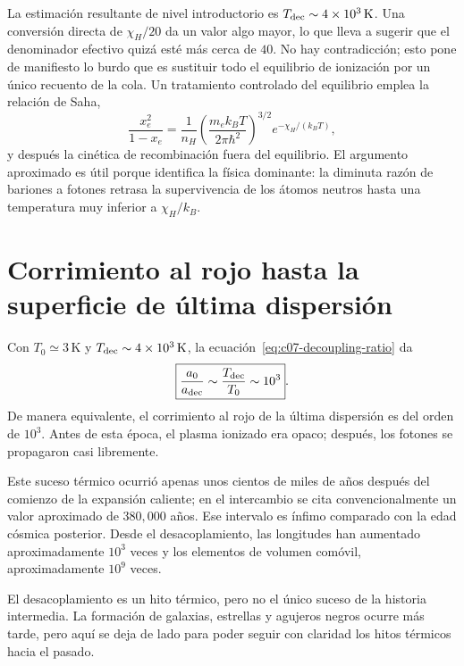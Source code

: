 La estimación resultante de nivel introductorio es \(T_{\rm dec}\sim4\times10^3\,\mathrm{K}\). Una conversión directa de \(\chi_H/20\) da un valor algo mayor, lo que lleva a sugerir que el denominador efectivo quizá esté más cerca de \(40\). No hay contradicción; esto pone de manifiesto lo burdo que es sustituir todo el equilibrio de ionización por un único recuento de la cola. Un tratamiento controlado del equilibrio emplea la relación de Saha,
\begin{equation}
\frac{x_e^2}{1-x_e}
=
\frac{1}{n_H}
\left(\frac{m_e k_BT}{2\pi\hbar^2}\right)^{3/2}
e^{-\chi_H/(k_BT)},
\label{eq:c07-saha}
\end{equation}
y después la cinética de recombinación fuera del equilibrio. El argumento aproximado es útil porque identifica la física dominante: la diminuta razón de bariones a fotones retrasa la supervivencia de los átomos neutros hasta una temperatura muy inferior a \(\chi_H/k_B\).

\section{Corrimiento al rojo hasta la superficie de última dispersión}

Con \(T_0\simeq3\,\mathrm{K}\) y \(T_{\rm dec}\sim4\times10^3\,\mathrm{K}\), la ecuación~\eqref{eq:c07-decoupling-ratio} da
\begin{equation}
\boxed{
\frac{a_0}{a_{\rm dec}}
\sim
\frac{T_{\rm dec}}{T_0}
\sim10^3
}.
\label{eq:c07-decoupling-expansion}
\end{equation}
De manera equivalente, el corrimiento al rojo de la última dispersión es del orden de \(10^3\). Antes de esta época, el plasma ionizado era opaco; después, los fotones se propagaron casi libremente.

Este suceso térmico ocurrió apenas unos cientos de miles de años después del comienzo de la expansión caliente; en el intercambio se cita convencionalmente un valor aproximado de \(380{,}000\) años. Ese intervalo es ínfimo comparado con la edad cósmica posterior. Desde el desacoplamiento, las longitudes han aumentado aproximadamente \(10^3\) veces y los elementos de volumen comóvil, aproximadamente \(10^9\) veces.

El desacoplamiento es un hito térmico, pero no el único suceso de la historia intermedia. La formación de galaxias, estrellas y agujeros negros ocurre más tarde, pero aquí se deja de lado para poder seguir con claridad los hitos térmicos hacia el pasado.

